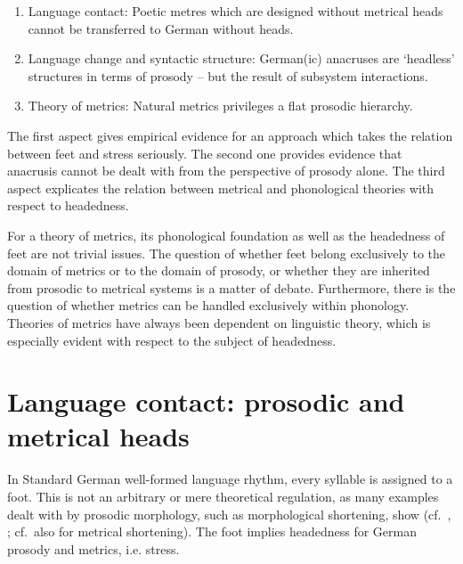 \documentclass[output=paper
  ,nobabel
  ,uniformtopskip %
]{langscibook}
\begin{document}
\begin{sloppypar}
\begin{enumerate}
    \item Language contact: Poetic metres which are designed without metrical heads cannot be transferred to German without heads.

    \item Language change and syntactic structure: German(ic) anacruses are `headless' structures in terms of prosody – but the result of subsystem interactions.

    \item Theory of metrics: Natural metrics privileges a flat prosodic hierarchy.
\end{enumerate}
\end{sloppypar}

\largerpage
\noindent
The first aspect gives empirical evidence for an approach which takes the relation between feet and stress seriously. The second one provides evidence that anacrusis cannot be dealt with from the perspective of prosody alone. The third aspect explicates the relation between metrical and phonological theories with respect to headedness.

For a theory of metrics, its phonological foundation as well as the headedness of feet are not trivial issues. The question of whether feet belong exclusively to the domain of metrics or to the domain of prosody, or whether they are inherited from prosodic to metrical systems is a matter of debate. Furthermore, there is the question of whether metrics can be handled exclusively within phonology. Theories of metrics have always been dependent on linguistic theory, which is especially evident with respect to the subject of headedness. 

\section{Language contact: prosodic and metrical heads}\label{sec-languagecontact}

In Standard German well-formed language rhythm, every syllable is assigned to a foot. This is not an
arbitrary or mere theoretical regulation, as many examples dealt with by prosodic morphology, such
as morphological shortening, show (cf.\ \eg \citealt{LibermanPrince1977}, \citealt{Vennemann1995};
cf.\ also \citealt{DresherLahiri2005} for metrical shortening). The foot implies headedness for
German prosody and metrics, i.e. stress.
\end{document}
